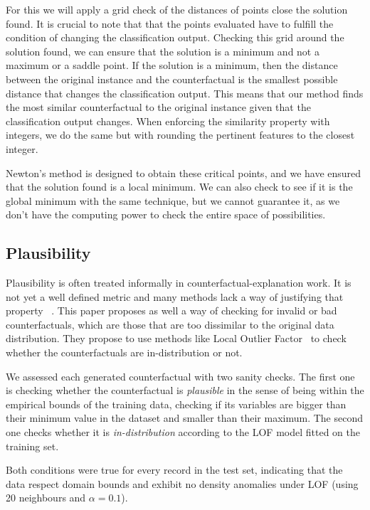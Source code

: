 \documentclass[12pt]{extarticle}
\numberwithin{equation}{section}
\begin{document}
For this we will apply a grid check of the distances of points close the solution found. It is crucial to note that that the points evaluated have to fulfill the condition of changing the classification output. Checking this grid around the solution found, we can ensure that the solution is a minimum and not a maximum or a saddle point. If the solution is a minimum, then the distance between the original instance and the counterfactual is the smallest possible distance that changes the classification output. This means that our method finds the most similar counterfactual to the original instance given that the classification output changes. When enforcing the similarity property with integers, we do the same but with rounding the pertinent features to the closest integer.

Newton's method is designed to obtain these critical points, and we have ensured that the solution found is a local minimum. We can also check to see if it is the global minimum with the same technique, but we cannot guarantee it, as we don't have the computing power to check the entire space of possibilities.

\subsection{Plausibility}\label{sec:plausibility}
Plausibility is often treated informally in counterfactual-explanation work. It is not yet a well defined metric and many methods lack a way of justifying that property ~\cite{plausibility}. This paper proposes as well a way of checking for invalid or bad counterfactuals, which are those that are too dissimilar to the original data distribution. They propose to use methods like Local Outlier Factor~\cite{lof} to check whether the counterfactuals are in-distribution or not. 

We assessed each generated counterfactual with two sanity checks. The first one is checking whether the counterfactual is \emph{plausible} in the sense of being within the empirical bounds of the training data, checking if its variables are bigger than their minimum value in the dataset and smaller than their maximum. The second one checks whether it is \emph{in-distribution} according to the LOF model fitted on the training set.

Both conditions were true for every record in the test set, indicating that the data respect domain bounds and exhibit no density anomalies under LOF (using 20 neighbours and $\alpha = 0.1$).
\end{document}
